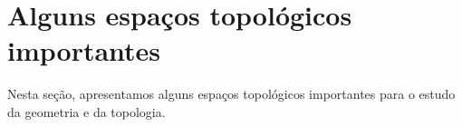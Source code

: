 \section{Alguns espaços topológicos importantes}
\label{alguns-espacos-topologicos-importantes}
Nesta seção, apresentamos alguns espaços topológicos importantes para o estudo da geometria e da topologia.





